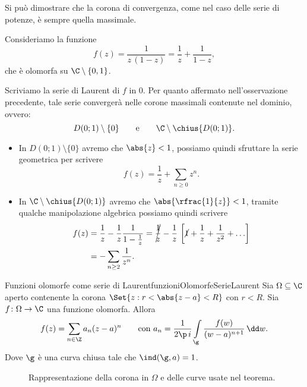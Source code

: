 \begin{oss}\label{oss:coronaMassimale}
	Si può dimostrare che la corona di convergenza, come nel caso delle serie di potenze, è sempre quella massimale.
\end{oss}

\begin{ese}
	Consideriamo la funzione
	\[
		f(z) = \frac{1}{z\,(1-z)} = \frac{1}{z} + \frac{1}{1-z},
	\]
	che è olomorfa su \(\C\setminus\{0,1\}\).

	Scriviamo la serie di Laurent di \(f\) in \(0\).
	Per quanto affermato nell'osservazione precedente, tale serie convergerà nelle corone massimali contenute nel dominio, ovvero:
	\[
		D(0;1)\setminus\{0\} \qquad\text{e}\qquad \C\setminus \chius{D(0;1)}.
	\]
	\begin{itemize}
		\item In \(D(0;1)\setminus\{0\}\) avremo che \(\abs{z}<1\), possiamo quindi sfruttare la serie geometrica per scrivere
		      \[
			      f(z) = \frac{1}{z} + \sum_{n\ge 0} z^n.
		      \]
		\item In \(\C\setminus\chius{D(0;1)}\) avremo che \(\abs{\rfrac{1}{z}}<1\), tramite qualche manipolazione algebrica possiamo quindi scrivere
		      \[
			      \begin{split}
				      f(z) & = \frac{1}{z} - \frac{1}{z} \frac{1}{1-\frac{1}{z}} = \cancel{\frac{1}{z}}-\frac{1}{z}\,\left[\cancel{1}+\frac{1}{z}+\frac{1}{z^2}+\ldots\right]\\
				      & = -\sum_{n\ge 2}\frac{1}{z^n}.
			      \end{split}
		      \]
	\end{itemize}
\end{ese}

\begin{teor}{Funzioni olomorfe come serie di Laurent}{funzioniOlomorfeSerieLaurent}
	Sia \(\Omega\subseteq \C\) aperto contenente la corona \(\Set{z:r<\abs{z-a}<R}\) con \(r<R\). Sia \(f\colon \Omega \to \C\) una funzione olomorfa.
	Allora
	\[
		f(z) = \sum_{n\in\Z} a_n (z-a)^n \qquad\text{con }a_n = \frac{1}{2\p\,i} \int\limits_\g \frac{f(w)}{(w-a)^{n+1}}\,\dd w.
	\]
	Dove \(\g\) è una curva chiusa tale che \(\ind(\g,a)=1\).
\end{teor}

\begin{figure}[tp]
	\centering
	
	\caption{Rappresentazione della corona in \(\Omega\) e delle curve usate nel teorema.}
	\label{fig:funzioniOlomorfeSerieLaurent}
\end{figure}

